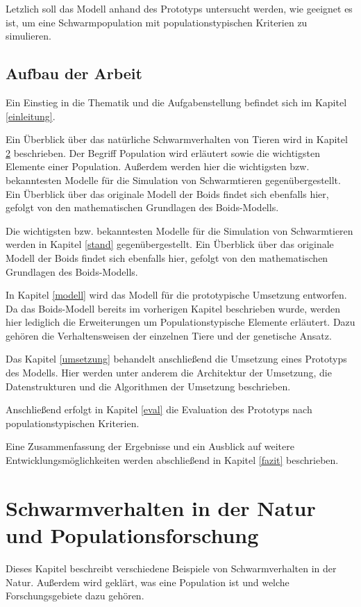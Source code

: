 \documentclass[draft=false
              ,paper=a4
              ,twoside=false
              ,fontsize=11pt
              ,headsepline
              ,BCOR10mm
              ,DIV11
              ,bibtotoc
              ,liststotoc
              ]{scrbook}
\begin{document}
Letzlich soll das Modell anhand des Prototyps untersucht werden, wie geeignet es ist, um eine Schwarmpopulation mit populationstypischen Kriterien zu simulieren.

\section{Aufbau der Arbeit}
Ein Einstieg in die Thematik und die Aufgabenstellung befindet sich im Kapitel \ref{einleitung}.

Ein Überblick über das natürliche Schwarmverhalten von Tieren wird in Kapitel \ref{natur} beschrieben. Der Begriff Population wird erläutert sowie die wichtigsten Elemente einer Population. Außerdem werden hier die wichtigsten bzw. bekanntesten Modelle für die Simulation von Schwarmtieren gegenübergestellt. Ein Überblick über das originale Modell der Boids findet sich ebenfalls hier, gefolgt von den mathematischen Grundlagen des Boids-Modells.

Die wichtigsten bzw. bekanntesten Modelle für die Simulation von Schwarmtieren werden in Kapitel \ref{stand} gegenübergestellt. Ein Überblick über das originale Modell der Boids findet sich ebenfalls hier, gefolgt von den mathematischen Grundlagen des Boids-Modells.

In Kapitel \ref{modell} wird das Modell für die prototypische Umsetzung entworfen. Da das Boids-Modell bereits im vorherigen Kapitel beschrieben wurde, werden hier lediglich die Erweiterungen um Populationstypische Elemente erläutert. Dazu gehören die Verhaltensweisen der einzelnen Tiere und der genetische Ansatz.

Das Kapitel \ref{umsetzung} behandelt anschließend die Umsetzung eines Prototyps des Modells. Hier werden unter anderem die Architektur der Umsetzung, die Datenstrukturen und die Algorithmen der Umsetzung beschrieben.

Anschließend erfolgt in Kapitel \ref{eval} die Evaluation des Prototyps nach populationstypischen Kriterien.

Eine Zusammenfassung der Ergebnisse und ein Ausblick auf weitere Entwicklungsmöglichkeiten werden abschließend in Kapitel \ref{fazit} beschrieben.

\chapter{Schwarmverhalten in der Natur und Populationsforschung}\label{natur}
Dieses Kapitel beschreibt verschiedene Beispiele von Schwarmverhalten in der Natur. Außerdem wird geklärt, was eine Population ist und welche Forschungsgebiete dazu gehören.
\end{document}
